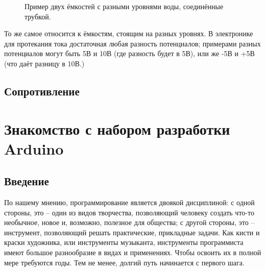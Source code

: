 \documentclass[a4paper,twoside]{book}
\begin{document}
\begin{figure}[ht]
  \centering
  \caption{Пример двух ёмкостей с разными уровнями воды, соединённые трубкой.}
  \label{fig:electronics-circuits-3}
\end{figure}

То же самое относится к ёмкостям, стоящим на разных уровнях.  В электронике для
протекания тока достаточная любая разность потенциалов; примерами разных
потенциалов могут быть 5В и 10В (где разность будет в 5В), или же -5В и +5В (что
даёт разницу в 10В.)

\section{Сопротивление}

\chapter{Знакомство с набором разработки Arduino}

\section{Введение}
По нашему мнению, программирование является двоякой дисциплиной: с одной
стороны, это – один из видов творчества, позволяющий человеку создать что-то
необычное, новое и, возможно, полезное для общества; с другой стороны, это –
инструмент, позволяющий решать практические, прикладные задачи. Как кисти и
краски художника, или инструменты музыканта, инструменты программиста имеют
большое разнообразие в видах и применениях. Чтобы освоить их в полной мере
требуются годы. Тем не менее, долгий путь начинается с первого шага.
\end{document}
